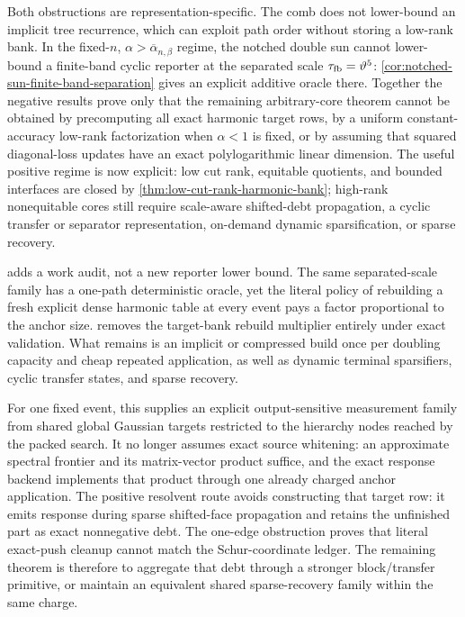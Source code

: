 Both obstructions are representation-specific.  The comb does not lower-bound
an implicit tree recurrence, which can exploit path order without storing a
low-rank bank.  In the fixed-$n$, $\alpha>\overline\alpha_{n,\beta}$ regime,
the notched double sun cannot lower-bound a finite-band cyclic reporter at the
separated scale $\tau_{\rm fb}=\vartheta^5$:
\cref{cor:notched-sun-finite-band-separation} gives an explicit additive
oracle there.  Together the negative results prove only that the remaining arbitrary-core
theorem cannot be obtained by precomputing all exact harmonic target rows, by
a uniform constant-accuracy low-rank factorization when $\alpha<1$ is fixed,
or by assuming that squared diagonal-loss updates have an exact
polylogarithmic linear dimension.  The useful positive regime is now
explicit: low cut rank, equitable quotients, and bounded interfaces are
closed by \cref{thm:low-cut-rank-harmonic-bank}; high-rank nonequitable cores
still require scale-aware shifted-debt propagation, a cyclic transfer or
separator representation, on-demand dynamic sparsification, or sparse
recovery.

 adds a work audit, not a
new reporter lower bound.  The same separated-scale family has a one-path
deterministic oracle, yet the literal policy of rebuilding a fresh explicit
dense harmonic table at every event pays a factor proportional to the anchor
size.   removes the target-bank
rebuild multiplier entirely under exact validation.  What remains is an
implicit or compressed build once per doubling capacity and cheap repeated
application, as well as dynamic terminal sparsifiers, cyclic transfer states,
and sparse recovery.

For one fixed event, this supplies an explicit output-sensitive measurement
family from shared
global Gaussian targets restricted to the hierarchy nodes reached by the
packed search.  It no longer assumes exact source whitening: an approximate
spectral frontier and its matrix-vector product suffice, and the exact
response backend implements that product through one already charged anchor
application.  The positive resolvent route avoids constructing that target
row: it emits response during sparse shifted-face propagation and retains the
unfinished part as exact nonnegative debt.  The one-edge obstruction proves
that literal exact-push cleanup cannot match the Schur-coordinate ledger.  The
remaining theorem is therefore to aggregate that debt through a stronger
block/transfer primitive, or maintain an equivalent shared sparse-recovery
family within the same charge.

